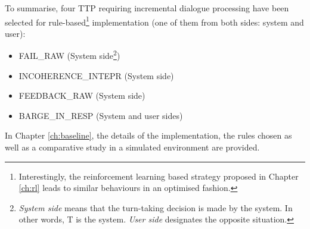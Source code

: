 				To summarise, four TTP requiring incremental dialogue processing have been selected for rule-based\footnote{Interestingly, the reinforcement learning based strategy proposed in Chapter \ref{ch:rl} leads to similar behaviours in an optimised fashion.} implementation (one of them from both sides: system and user):
				\begin{itemize}
					\item FAIL\_RAW (System side\footnote{\textit{System side} means that the turn-taking decision is made by the system. In other words, T is the system. \textit{User side} designates the opposite situation.})
					\item INCOHERENCE\_INTEPR (System side)
					\item FEEDBACK\_RAW (System side)
					\item BARGE\_IN\_RESP (System and user sides)
				\end{itemize}

				In Chapter \ref{ch:baseline}, the details of the implementation, the rules chosen as well as a comparative study in a simulated environment are provided.
